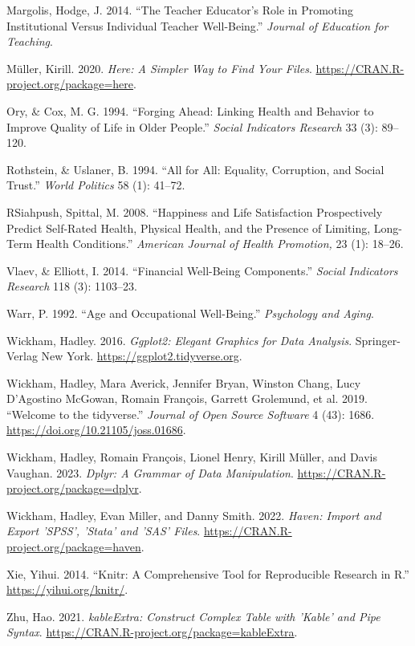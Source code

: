\documentclass[
  letterpaper,
  DIV=11,
  numbers=noendperiod]{scrartcl}
\newlength{\cslhangindent}
\newlength{\cslentryspacingunit} %
\newenvironment{CSLReferences}[2] %
 {%
  \setlength{\parindent}{0pt}
  \ifodd #1
  \let\oldpar\par
  \def\par{\hangindent=\cslhangindent\oldpar}
  \fi
  \setlength{\parskip}{#2\cslentryspacingunit}
 }%
 {}
\begin{document}
\begin{CSLReferences}{1}{0}
\leavevmode{}%
Margolis, Hodge, J. 2014. {``The Teacher Educator's Role in Promoting
Institutional Versus Individual Teacher Well-Being.''} \emph{Journal of
Education for Teaching}.

\leavevmode{}%
Müller, Kirill. 2020. \emph{Here: A Simpler Way to Find Your Files}.
\url{https://CRAN.R-project.org/package=here}.

\leavevmode{}%
Ory, \& Cox, M. G. 1994. {``Forging Ahead: Linking Health and Behavior
to Improve Quality of Life in Older People.''} \emph{Social Indicators
Research} 33 (3): 89--120.

\leavevmode{}%
Rothstein, \& Uslaner, B. 1994. {``All for All: Equality, Corruption,
and Social Trust.''} \emph{World Politics} 58 (1): 41--72.

\leavevmode{}%
RSiahpush, Spittal, M. 2008. {``Happiness and Life Satisfaction
Prospectively Predict Self-Rated Health, Physical Health, and the
Presence of Limiting, Long-Term Health Conditions.''} \emph{American
Journal of Health Promotion,} 23 (1): 18--26.

\leavevmode{}%
Vlaev, \& Elliott, I. 2014. {``Financial Well-Being Components.''}
\emph{Social Indicators Research} 118 (3): 1103--23.

\leavevmode{}%
Warr, P. 1992. {``Age and Occupational Well-Being.''} \emph{Psychology
and Aging}.

\leavevmode{}%
Wickham, Hadley. 2016. \emph{Ggplot2: Elegant Graphics for Data
Analysis}. Springer-Verlag New York.
\url{https://ggplot2.tidyverse.org}.

\leavevmode{}%
Wickham, Hadley, Mara Averick, Jennifer Bryan, Winston Chang, Lucy
D'Agostino McGowan, Romain François, Garrett Grolemund, et al. 2019.
{``Welcome to the {tidyverse}.''} \emph{Journal of Open Source Software}
4 (43): 1686. \url{https://doi.org/10.21105/joss.01686}.

\leavevmode{}%
Wickham, Hadley, Romain François, Lionel Henry, Kirill Müller, and Davis
Vaughan. 2023. \emph{Dplyr: A Grammar of Data Manipulation}.
\url{https://CRAN.R-project.org/package=dplyr}.

\leavevmode{}%
Wickham, Hadley, Evan Miller, and Danny Smith. 2022. \emph{Haven: Import
and Export 'SPSS', 'Stata' and 'SAS' Files}.
\url{https://CRAN.R-project.org/package=haven}.

\leavevmode{}%
Xie, Yihui. 2014. {``Knitr: A Comprehensive Tool for Reproducible
Research in {R}.''} \url{https://yihui.org/knitr/}.

\leavevmode{}%
Zhu, Hao. 2021. \emph{kableExtra: Construct Complex Table with 'Kable'
and Pipe Syntax}. \url{https://CRAN.R-project.org/package=kableExtra}.

\end{CSLReferences}
\end{document}
